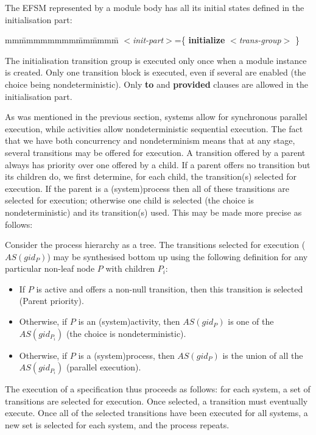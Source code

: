 The EFSM represented by a module body has all its initial
states defined in the initialisation part:

\begin{tabbing}
mm\=mmmmmmmm\=mm\=mmmm\=\+\kill
$<${\em init-part}$>$\>=\>\{ {\bf initialize} $<${\em trans-group}$>$ \}\\
\end{tabbing}

The initialisation transition group is executed only once
when a module instance is created. Only one transition
block is executed, even if several are enabled (the choice
being nondeterministic). Only {\bf to} and {\bf provided} clauses are
allowed in the initialisation part.

As was mentioned in the previous section, systems allow
for synchronous parallel execution, while activities allow
nondeterministic sequential execution. The fact that we
have both concurrency and nondeterminism means that at any
stage, several transitions may be offered for execution. A
transition offered by a parent always has priority over one
offered by a child. If a parent offers no transition but
its children do, we first determine, for each child, the
transition(s) selected for execution. If the parent is a
(system)process then all of these transitions are selected
for execution; otherwise one child is selected (the choice
is nondeterministic) and its transition(s) used. This may
be made more precise as follows:

Consider the process hierarchy as a tree. The
transitions selected for execution ({\em $AS(gid_{P})$}) may be
synthesised bottom up using the following definition for any
particular non-leaf node {\em $P$} with children {\em $P_{i}$}:
 
\begin{itemize}
\item If {\em $P$} is active and offers a non-null transition, then this
 transition is selected (Parent priority).
\item Otherwise, if {\em $P$} is an (system)activity, then {\em
$AS(gid_{P})$} is one of the {\em $AS(gid_{P_{i}})$} (the choice is
nondeterministic).
\item Otherwise, if {\em $P$} is a (system)process, then {\em
$AS(gid_{P})$} is the union of all the {\em $AS(gid_{P_{i}})$} (parallel execution).
\end{itemize}
 
The execution of a specification thus proceeds as
follows: for each system, a set of transitions are selected
for execution. Once selected, a transition must eventually
execute. Once all of the selected transitions have been
executed for all systems, a new set is selected for each
system, and the process repeats.
 
